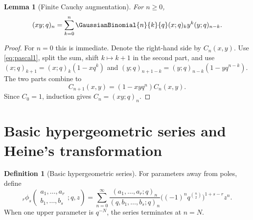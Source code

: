 \documentclass[11pt]{article}
\numberwithin{equation}{section}
\newtheorem{lemma}[theorem]{Lemma}
\theoremstyle{definition}
\newtheorem{definition}[theorem]{Definition}
\theoremstyle{remark}
\begin{document}
\begin{lemma}[Finite Cauchy augmentation]\label{lem:cauchyaug}
For $n\ge0$,
\begin{equation}\label{eq:cauchyaug}
(xy;q)_n=\sum_{k=0}^n\GaussianBinomial{n}{k}{q}(x;q)_k y^k(y;q)_{n-k}.
\end{equation}
\end{lemma}
\begin{proof}
For $n=0$ this is immediate.  Denote the right-hand side by $C_n(x,y)$.
Use \eqref{eq:pascal1}, split the sum, shift $k\mapsto k+1$ in the second
part, and use
$(x;q)_{k+1}=(x;q)_k(1-xq^k)$ and
$(y;q)_{n+1-k}=(y;q)_{n-k}(1-yq^{n-k})$.
The two parts combine to
\[
C_{n+1}(x,y)=(1-xyq^n)C_n(x,y).
\]
Since $C_0=1$, induction gives $C_n=(xy;q)_n$.
\end{proof}

\section{Basic hypergeometric series and Heine's transformation}

\begin{definition}[Basic hypergeometric series]
For parameters away from poles, define
\[
{}_r\phi_s\!\left(\begin{matrix}a_1,\dots,a_r\\b_1,\dots,b_s\end{matrix};q,z\right)
=\sum_{n=0}^{\infty}
\frac{(a_1,\dots,a_r;q)_n}{(q,b_1,\dots,b_s;q)_n}
\bigl((-1)^nq^{\binom n2}\bigr)^{1+s-r}z^n.
\]
When one upper parameter is $q^{-N}$, the series terminates at $n=N$.
\end{definition}
\end{document}
